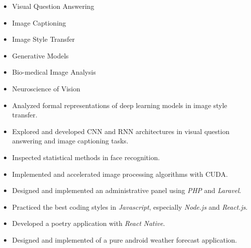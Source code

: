\documentclass[10pt,a4paper]{altacv}
\begin{document}

\begin{multicols}{2}
\begin{itemize}
    \item Visual Question Answering
    \item Image Captioning
    \item Image Style Transfer
    \item Generative Models
  	\item Bio-medical Image Analysis
  	\item Neuroscience of Vision
\end{itemize}
\end{multicols}

\begin{itemize}
\item Analyzed formal representations of deep learning models in image style transfer.
\item Explored and developed CNN and RNN architectures in visual question answering and image captioning tasks.
\item Inspected statistical methods in face recognition.
\item Implemented and accelerated image processing algorithms with CUDA.
\end{itemize}


\begin{itemize}
\item Designed and implemented an administrative panel using \textit{PHP} and \textit{Laravel}.
\item Practiced the best coding styles in \textit{Javascript}, especially \textit{Node.js} and \textit{React.js}.
\end{itemize}

\divider

\begin{itemize}
	\item Developed a poetry application with \textit{React Native}.
	\item Designed and implemented of a pure android weather forecast application.
\end{itemize}
\end{document}

